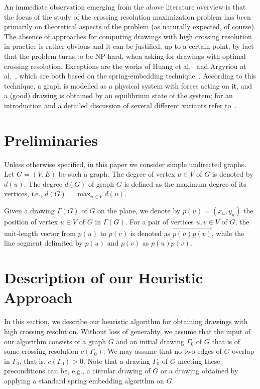 \documentclass{llncs}
\begin{document}
An immediate observation emerging from the above literature overview is that the focus of the study of the crossing resolution maximization problem has been primarily on theoretical aspects of the problem (as naturally expected, of course). The absence of approaches for computing drawings with high crossing resolution in practice is rather obvious and it can be justified, up to a certain point, by fact that the problem turns to be NP-hard, when asking for drawings with optimal crossing resolution. Exceptions are the works of Huang et al.~\cite{DBLP:journals/vlc/HuangEHL13} and Argyriou at al.~\cite{DBLP:journals/cj/ArgyriouBS13}, which are both based on the spring-embedding technique~\cite{DBLP:journals/congnum/Eades84}. According to this technique, a graph is modelled as a physical system with forces acting on it, and a (good) drawing is obtained by an equilibrium state of the system; for an introduction and a detailed discussion of several different variants refer to~\cite{DBLP:books/ph/BattistaETT99}. 

\section{Preliminaries}
\label{sec:preliminaries}

Unless otherwise specified, in this paper we consider simple undirected graphs. Let $G=(V,E)$ be such a graph. The degree of vertex $u\in V$ of $G$ is denoted by $d(u)$. The degree $d(G)$ of  graph $G$ is defined as the maximum degree of its vertices, i.e., $d(G)=\max_{u\in V}d(u)$.

Given a drawing $\Gamma(G)$ of $G$ on the plane, we denote by $p(u)=(x_u,y_u)$ the position of vertex $u \in V$ of $G$ in $\Gamma(G)$. For a pair of vertices $u,v\in V$ of $G$, the unit-length vector from $p(u)$ to $p(v)$ is denoted as $\overrightarrow{p(u)p(v)}$, while the line segment delimited by $p(u)$ and $p(v)$ as $\overline{p(u)p(v)}$.


\section{Description of our Heuristic Approach}
\label{sec:algorithm}

In this section, we describe our heuristic algorithm for obtaining drawings with high crossing resolution. Without loss of generality, we assume that the input of our algorithm consists of a graph $G$ and an initial drawing $\Gamma_0$ of $G$ that is of some crossing resolution $c(\Gamma_0)$. We may assume that no two edges of $G$ overlap in $\Gamma_0$, that is, $c(\Gamma_0)>0$. Note that a drawing $\Gamma_0$ of $G$ meeting these preconditions can be, e.g., a circular drawing of $G$ or a drawing obtained by applying a standard spring embedding algorithm on $G$. 
\end{document}

